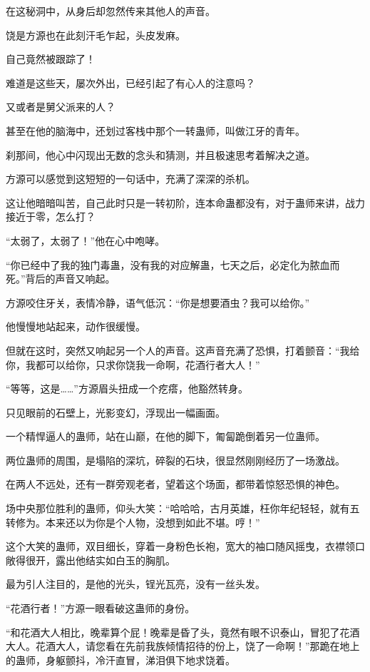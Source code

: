 
\begin{this_body}

在这秘洞中，从身后却忽然传来其他人的声音。

饶是方源也在此刻汗毛乍起，头皮发麻。

自己竟然被跟踪了！

难道是这些天，屡次外出，已经引起了有心人的注意吗？

又或者是舅父派来的人？

甚至在他的脑海中，还划过客栈中那个一转蛊师，叫做江牙的青年。

刹那间，他心中闪现出无数的念头和猜测，并且极速思考着解决之道。

方源可以感觉到这短短的一句话中，充满了深深的杀机。

这让他暗暗叫苦，自己此时只是一转初阶，连本命蛊都没有，对于蛊师来讲，战力接近于零，怎么打？

“太弱了，太弱了！”他在心中咆哮。

“你已经中了我的独门毒蛊，没有我的对应解蛊，七天之后，必定化为脓血而死。”背后的声音又响起。

方源咬住牙关，表情冷静，语气低沉：“你是想要酒虫？我可以给你。”

他慢慢地站起来，动作很缓慢。

但就在这时，突然又响起另一个人的声音。这声音充满了恐惧，打着颤音：“我给你，我都可以给你，只求你饶我一命啊，花酒行者大人！”

“等等，这是……”方源眉头扭成一个疙瘩，他豁然转身。

只见眼前的石壁上，光影变幻，浮现出一幅画面。

一个精悍逼人的蛊师，站在山巅，在他的脚下，匍匐跪倒着另一位蛊师。

两位蛊师的周围，是塌陷的深坑，碎裂的石块，很显然刚刚经历了一场激战。

在两人不远处，还有一群旁观老者，望着这个场面，都带着惊怒恐惧的神色。

场中央那位胜利的蛊师，仰头大笑：“哈哈哈，古月英雄，枉你年纪轻轻，就有五转修为。本来还以为你是个人物，没想到如此不堪。哼！”

这个大笑的蛊师，双目细长，穿着一身粉色长袍，宽大的袖口随风摇曳，衣襟领口敞得很开，露出他结实如白玉的胸肌。

最为引人注目的，是他的光头，锃光瓦亮，没有一丝头发。

“花酒行者！”方源一眼看破这蛊师的身份。

“和花酒大人相比，晚辈算个屁！晚辈是昏了头，竟然有眼不识泰山，冒犯了花酒大人。花酒大人，请您看在先前我族倾情招待的份上，饶了一命啊！”那跪在地上的蛊师，身躯颤抖，冷汗直冒，涕泪俱下地求饶着。


\end{this_body}
